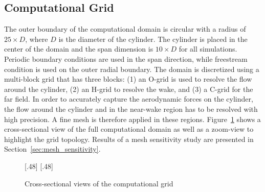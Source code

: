 \subsection{Computational Grid}
\label{sec:grids}
%
The outer boundary of the computational domain is circular with a radius of
$25\times D$, where $D$ is the diameter of the cylinder. The cylinder is placed
in the center of the domain and the span dimension is $10\times D$ for all
simulations. Periodic boundary conditions are used in the span direction, while
freestream condition is used on the outer radial boundary. The domain is
discretized using a multi-block grid that has three blocks: (1) an O-grid is
used to resolve the flow around the cylinder, (2) an H-grid to resolve the
wake, and (3) a C-grid for the far field. In order to accurately capture the
aerodynamic forces on the cylinder, the flow around the cylinder and in the
near-wake region has to be resolved with high precision. A fine mesh is
therefore applied in these regions.  Figure~\ref{fig:Mesh} shows a
cross-sectional view of the full computational domain as well as a zoom-view to
highlight the grid topology. Results of a mesh sensitivity study are presented
in Section~\ref{sec:mesh_sensitivity}.
%
\begin{figure}[htb!]
  \centering
    [.48\linewidth]{}
  \hspace*{\fill}
    [.48\linewidth]{}
  \caption{Cross-sectional views of the computational grid}
  \label{fig:Mesh}
\end{figure}


